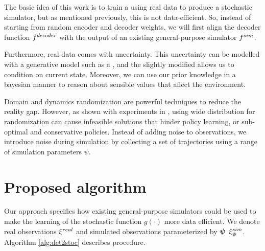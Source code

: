 The basic idea of this work is to train a \cvae{} using real data to produce a stochastic simulator, but as mentioned previously, this is not data-efficient. So, instead of starting from random encoder and decoder weights, we will first align the decoder function $f^{decoder}{}$ with the output of an existing general-purpose simulator $f^{sim}{}$.

Furthermore, real data comes with uncertainty. This uncertainty can be modelled with a generative model such as a \vae{}, and the slightly modified \cvae{} allows us to condition on current state. Moreover, we can use our prior knowledge in a bayesian manner to reason about sensible values that affect the environment.

Domain and dynamics randomization are powerful techniques to reduce the reality gap. However, as shown with experiments in \parencite{Chebotar2018}, using wide distribution for randomization can cause infeasible solutions that hinder policy learning, or sub-optimal and conservative policies. Instead of adding noise to observations, we introduce noise during simulation by collecting a set of trajectories using a range of simulation parameters $\psi$. 


\section{Proposed \dettostoc{} algorithm}
\label{det2stoc:algorithm}

Our approach specifies how existing general-purpose simulators could be used to make the learning of the stochastic function $g(\cdot)$ more data efficient. We denote real observations $\xi^{real}$ and simulated observations parameterized by $\boldsymbol{\psi}$ $\xi^{sim}_{\boldsymbol{\psi}}$. Algorithm \ref{alg:det2stoc} describes \dettostoc{} procedure.

